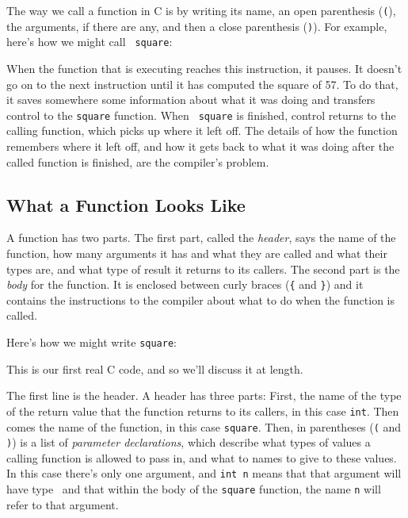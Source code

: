     The way we call a function in C is by writing its name, an open
parenthesis ({\tt (}), the arguments, if there are any, and then a close
parenthesis ({\tt )}).  For example, here's how we might call {\tt
square}:

\begin{flushleft}
\verb%    square(57);%
\end{flushleft}

When the function that is executing reaches this instruction, it pauses.
It doesn't go on to the next instruction until it has computed the square
of 57.  To do that, it saves somewhere some information about what it
was doing and transfers control to the {\tt square} function.  When {\tt
square} is finished, control returns to the calling function, which
picks up where it left off.  The details of how the function remembers
where it left off, and how it gets back to what it was doing after the
called function is finished, are the compiler's problem.

\subsection{What a Function Looks Like}

A function has two parts.  The first part, called the {\em header}, says
the name of the function, how many arguments it has and what they are
called and what their types are, and what type of result it returns to
its callers.  The second part is the {\em body} for the function.  It is
enclosed between curly braces ({\verb+{+} and {\verb+}+}) and it contains the
instructions to the compiler about what to do when the function is
called.

Here's how we might write {\tt square}:
\label{square-program}

\begin{flushleft}
    \verb%    int square(int n)%
\\* \verb%    {%
\\* \verb%      return n*n;%
\\* \verb%    }%
\end{flushleft}

\noindent This is our first real C code, and so we'll discuss it at length.

The first line is the header.  A header has three parts: First, the name
of the type of the return value that the function returns to its callers,
in this case {\tt int}.  Then comes the name of the function, in this
case {\tt square}.  Then, in parentheses ({\tt (} and {\tt )}) is a list
of {\em parameter declarations}, which describe what types of values a
calling function is allowed to pass in, and what to names to give to
these values.  In this case there's only one argument, and {\tt int n}
means that that argument will have type \int\ and that within the body
of the {\tt square} function, the name {\tt n} will refer to that
argument.

